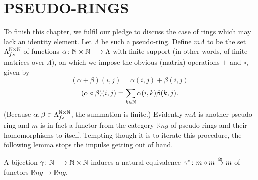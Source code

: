\section*{PSEUDO-RINGS}

To finish this chapter, we fulfil our pledge to discuss the case of rings which may lack an
 identity element. Let $\Lambda$ be such a pseudo-ring. Define $m\Lambda$ to be the set $\Lambda_{fs}^{\mathbb{N}\times \mathbb{N}}$ of functions
$\alpha\colon  \mathbb{N}\times \mathbb{N}\longrightarrow \Lambda$ with finite support (in other words, of finite matrices over $\Lambda$), on which we impose the obvious (matrix) operations $+$ and $\circ$, given by
\[(\alpha+\beta)(i,j)=\alpha(i,j)+\beta(i,j)\]
\[(\alpha \circ \beta)(i,j)=\sum_{k\in \mathbb{N}} \alpha(i,k)\beta(k,j).\]
(Because $\alpha,\beta\in \Lambda_{fs}^{\mathbb{N}\times \mathbb{N}}$, the summation is finite.) Evidently $m\Lambda$ is another pseudo-ring and $m$ is in fact a functor from the category $\mathbb{R}ng$ of pseudo-rings and their homomorphisms to itself.
Tempting though it is to iterate this procedure, the following lemma stops the impulse getting out of hand.
\begin{lemma}
A bijection $\gamma\colon  \mathbb{N}\longrightarrow \mathbb{N}\times \mathbb{N}$ induces a natural equivalence $\gamma^*\colon  m\circ m\overset{\cong}{\to} m$ of functors $\mathbb{R}ng\longrightarrow \mathbb{R}ng$.
\end{lemma}
